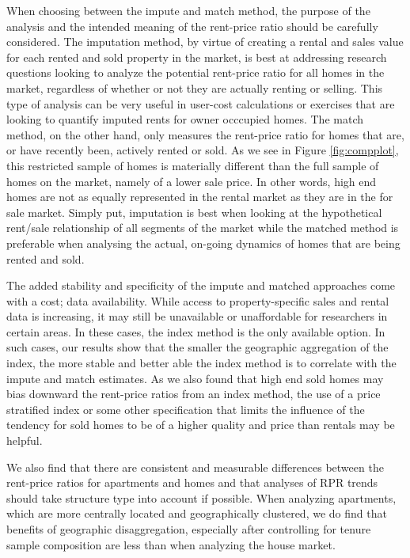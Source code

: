 \documentclass{article}\usepackage[]{graphicx}\usepackage[]{color}
\begin{document}
When choosing between the impute and match method, the purpose of the analysis and the intended meaning of the rent-price ratio should be carefully considered.  The imputation method, by virtue of creating a rental and sales value for each rented and sold property in the market, is best at addressing research questions looking to analyze the potential rent-price ratio for all homes in the market, regardless of whether or not they are actually renting or selling.  This type of analysis can be very useful in user-cost calculations or exercises that are looking to quantify imputed rents for owner occcupied homes.  The match method, on the other hand, only measures the rent-price ratio for homes that are, or have recently been, actively rented or sold.  As we see in Figure \ref{fig:compplot}, this restricted sample of homes is materially different than the full sample of homes on the market, namely of a lower sale price.  In other words, high end homes are not as equally represented in the rental market as they are in the for sale market. Simply put, imputation is best when looking at the hypothetical rent/sale relationship of all segments of the market while the matched method is preferable when analysing the actual, on-going dynamics of homes that are being rented and sold.\par

The added stability and specificity of the impute and matched approaches come with a cost; data availability.  While access to property-specific sales and rental data is increasing, it may still be unavailable or unaffordable for researchers in certain areas.  In these cases, the index method is the only available option.  In such cases, our results show that the smaller the geographic aggregation of the index, the more stable and better able the index method is to correlate with the impute and match estimates.  As we also found that high end sold homes may bias downward the rent-price ratios from an index method, the use of a price stratified index or some other specification that limits the influence of the tendency for sold homes to be of a higher quality and price than rentals may be helpful.\par

We also find that there are consistent and measurable differences between the rent-price ratios for apartments and homes and that analyses of RPR trends should take structure type into account if possible.  When analyzing apartments, which are more centrally located and geographically clustered, we do find that benefits of geographic disaggregation, especially after controlling for tenure sample composition are less than when analyzing the house market.\par
\end{document}

